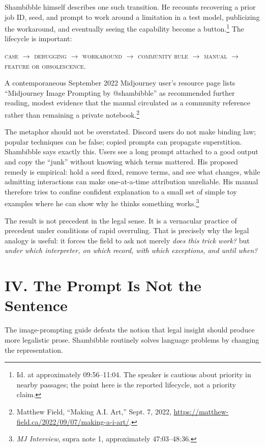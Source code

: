\documentclass[11pt]{article}
\begin{document}
Shambibble himself describes one such transition. He recounts recovering a prior job ID, seed, and prompt to work around a limitation in a test model, publicizing the workaround, and eventually seeing the capability become a button.\footnote{Id. at approximately 09:56--11:04. The speaker is cautious about priority in nearby passages; the point here is the reported lifecycle, not a priority claim.} The lifecycle is important:

\begin{center}
\textsc{case} $\rightarrow$ \textsc{debugging} $\rightarrow$ \textsc{workaround} $\rightarrow$ \textsc{community rule} $\rightarrow$ \textsc{manual} $\rightarrow$ \textsc{feature or obsolescence}.
\end{center}

A contemporaneous September 2022 Midjourney user's resource page lists ``Midjourney Image Prompting by @shambibble'' as recommended further reading, modest evidence that the manual circulated as a community reference rather than remaining a private notebook.\footnote{Matthew Field, ``Making A.I. Art,'' Sept. 7, 2022, \url{https://matthew-field.ca/2022/09/07/making-a-i-art/}.}

The metaphor should not be overstated. Discord users do not make binding law; popular techniques can be false; copied prompts can propagate superstition. Shambibble says exactly this. Users see a long prompt attached to a good output and copy the ``junk'' without knowing which terms mattered. His proposed remedy is empirical: hold a seed fixed, remove terms, and see what changes, while admitting interactions can make one-at-a-time attribution unreliable. His manual therefore tries to confine confident explanation to a small set of simple toy examples where he can show why he thinks something works.\footnote{\emph{MJ Interview}, supra note 1, approximately 47:03--48:36.}

The result is not precedent in the legal sense. It is a vernacular practice of precedent under conditions of rapid overruling. That is precisely why the legal analogy is useful: it forces the field to ask not merely \emph{does this trick work?} but \emph{under which interpreter, on which record, with which exceptions, and until when?}

\section*{IV. The Prompt Is Not the Sentence}
The image-prompting guide defeats the notion that legal insight should produce more legalistic prose. Shambibble routinely solves language problems by changing the representation.
\end{document}
